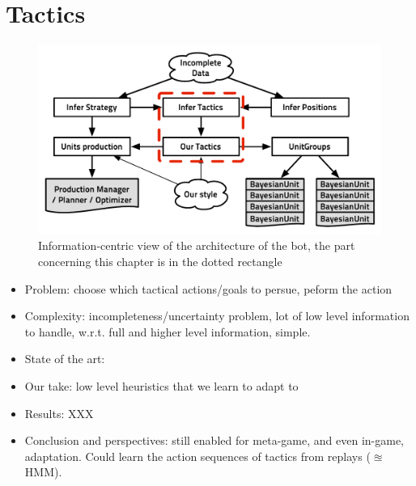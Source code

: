 \chapter{Tactics}
\begin{figure}[!ht]
\begin{center}
\includegraphics[width=13cm]{images/starcraft_bbq_concept_12-04-2012_TACTICS.pdf}
\end{center}
\label{fig:conceptTACTICS}
\caption{Information-centric view of the architecture of the bot, the part concerning this chapter is in the dotted rectangle}
\end{figure}
\begin{itemize}
\item Problem: choose which tactical actions/goals to persue, peform the action
\item Complexity: incompleteness/uncertainty problem, lot of low level information to handle, w.r.t. full and higher level information, simple.
\item State of the art: \citep{SORTS, Weber2010cr, Balla, CadenaG11}
\item Our take: low level heuristics that we learn to adapt to
\item Results: XXX
\item Conclusion and perspectives: still enabled for meta-game, and even in-game, adaptation. Could learn the action sequences of tactics from replays ($\approxeq$HMM).
\end{itemize}

